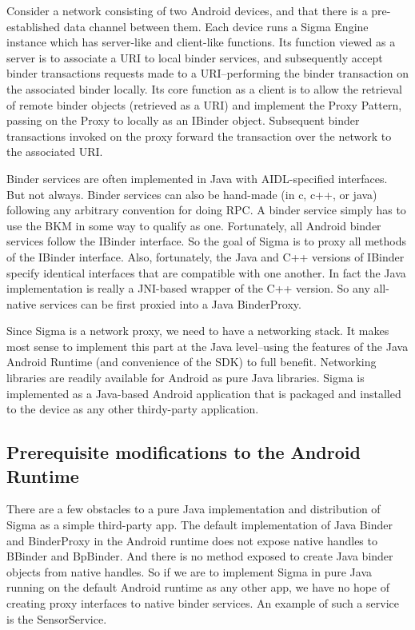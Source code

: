 \documentclass[prodmode]{acmlarge}
\begin{document}
Consider a network consisting of two Android devices, and that there is a pre-established data channel between them. Each device runs a Sigma Engine instance which has server-like and client-like functions. Its function viewed as a server is to associate a URI to local binder services, and subsequently accept binder transactions requests made to a URI--performing the binder transaction on the associated binder locally. Its core function as a client is to allow the retrieval of remote binder objects (retrieved as a URI) and implement the Proxy Pattern, passing on the Proxy to locally as an IBinder object. Subsequent binder transactions invoked on the proxy forward the transaction over the network to the associated URI.

Binder services are often implemented in Java with AIDL-specified interfaces. But not always. Binder services can also be hand-made (in c, c++, or java) following any arbitrary convention for doing RPC. A binder service simply has to use the BKM in some way to qualify as one. Fortunately, all Android binder services follow the IBinder interface. So the goal of Sigma is to proxy all methods of the IBinder interface. Also, fortunately, the Java and C++ versions of IBinder specify identical interfaces that are compatible with one another. In fact the Java implementation is really a JNI-based wrapper of the C++ version. So any all-native services can be first proxied into a Java BinderProxy.

Since Sigma is a network proxy, we need to have a networking stack. It makes most sense to implement this part at the Java level--using the features of the Java Android Runtime (and convenience of the SDK) to full benefit. Networking libraries are readily available for Android as pure Java libraries. Sigma is implemented as a Java-based Android application that is packaged and installed to the device as any other thirdy-party application.

\subsection{Prerequisite modifications to the Android Runtime}
There are a few obstacles to a pure Java implementation and distribution of Sigma as a simple third-party app. The default implementation of Java Binder and BinderProxy in the Android runtime does not expose native handles to BBinder and BpBinder. And there is no method exposed to create Java binder objects from native handles. So if we are to implement Sigma in pure Java running on the default Android runtime as any other app, we have no hope of creating proxy interfaces to native binder services. An example of such a service is the SensorService.
\end{document}
